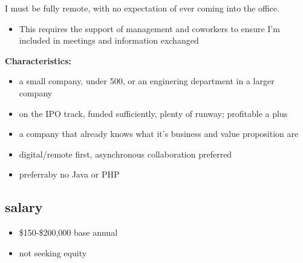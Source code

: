 \documentclass[
]{article}
\providecommand{\tightlist}{%
  \setlength{\itemsep}{0pt}\setlength{\parskip}{0pt}}
\begin{document}
I must be fully remote, with no expectation of ever coming into the
office.

\begin{itemize}
\tightlist
\item
  This requires the support of management and coworkers to ensure I'm
  included in meetings and information exchanged
\end{itemize}

\textbf{Characteristics:}

\begin{itemize}
\tightlist
\item
  a small company, under 500, or an enginering department in a larger
  company
\item
  on the IPO track, funded sufficiently, plenty of runway; profitable a
  plus
\item
  a company that already knows what it's business and value proposition
  are
\item
  digital/remote first, asynchronous collaboration preferred
\item
  preferraby no Java or PHP
\end{itemize}

\subsection{salary}\label{salary}

\begin{itemize}
\tightlist
\item
  \$150-\$200,000 base annual
\item
  not seeking equity
\end{itemize}
\end{document}
